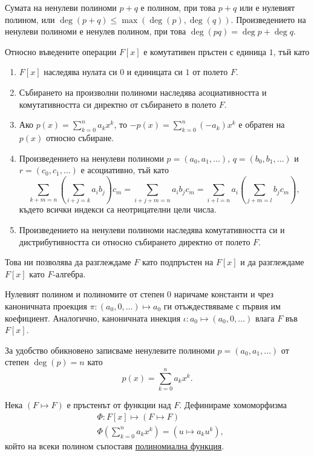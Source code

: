 \documentclass[numbers=endperiod, DIV=15]{scrartcl}
\begin{document}
Сумата на ненулеви полиноми $p + q$ е полином, при това $p + q$ или е нулевият полином, или $\deg(p + q) \leq \max(\deg(p), \deg(q))$. Произведението на ненулеви полиноми е ненулев полином, при това $\deg(pq) = \deg p + \deg q$.

Относно въведените операции $F[x]$ е комутативен пръстен с единица $1$, тъй като
\begin{enumerate}
  \item $F[x]$ наследява нулата си $0$ и единицата си $1$ от полето $F$.
  \item Събирането на произволни полиноми наследява асоциативността и комутативността си директно от събирането в полето $F$.
  \item Ако $p(x) = \sum_{k=0}^n a_k x^k$, то $-p(x) = \sum_{k=0}^n (-a_k) x^k$ е обратен на $p(x)$ относно събиране.
  \item Произведението на ненулеви полиноми $p = (a_0, a_1, \ldots)$, $q = (b_0, b_1, \ldots)$ и $r = (c_0, c_1, \ldots)$ е асоциативно, тъй като
  \begin{displaymath}
    \sum_{k+m=n} \left(\sum_{i+j=k} a_i b_j \right) c_m
    =
    \sum_{i+j+m=n} a_i b_j c_m
    =
    \sum_{i+l=n} a_i \left( \sum_{j+m=l} b_j c_m \right),
  \end{displaymath}
  където всички индекси са неотрицателни цели числа.
  \item Произведението на ненулеви полиноми наследява комутативността си и дистрибутивността си относно събирането директно от полето $F$.
\end{enumerate}

Това ни позволява да разглеждаме $F$ като подпръстен на $F[x]$ и да разглеждаме $F[x]$ като $F$-алгебра.

Нулевият полином и полиномите от степен $0$ наричаме константи и чрез каноничната проекция $\pi: (a_0, 0, \ldots) \mapsto a_0$ ги отъждествяваме с първия им коефициент. Аналогично, каноничната инекция $\iota: a_0 \mapsto (a_0, 0, \ldots)$ влага $F$ във $F[x]$.

За удобство обикновено записваме ненулевите полиноми $p = (a_0, a_1, \ldots)$ от степен $\deg(p) = n$ като
\begin{displaymath}
  p(x) = \sum_{k=0}^n a_k x^k.
\end{displaymath}

Нека $(F \mapsto F)$ е пръстенът от функции над $F$. Дефинираме хомоморфизма
\begin{align*}
  &\Phi: F[x] \mapsto (F \mapsto F) \\
  &\Phi\left( \sum_{k=0}^n a_k x^k \right) = \left( u \mapsto a_k u^k \right),
\end{align*}
който на всеки полином съпоставя \underline{полиномиална функция}.
\end{document}
